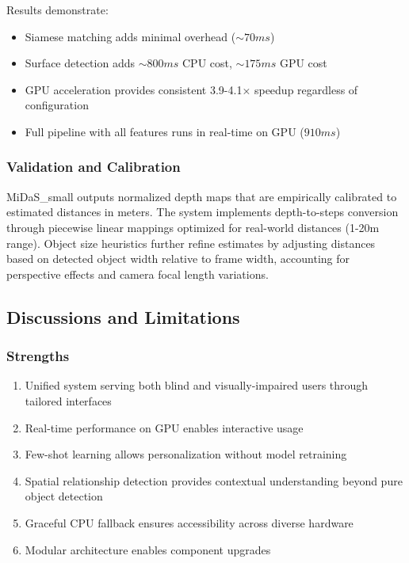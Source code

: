 \documentclass{article}
\begin{document}
Results demonstrate:
\begin{itemize}
    \item Siamese matching adds minimal overhead ($\sim70ms$)
    \item Surface detection adds $\sim800ms$ CPU cost, $\sim175ms$ GPU cost
    \item GPU acceleration provides consistent 3.9-4.1× speedup regardless of configuration
    \item Full pipeline with all features runs in real-time on GPU ($910ms$)
\end{itemize}

\subsubsection{Validation and Calibration}

MiDaS\_small outputs normalized depth maps that are empirically calibrated to estimated distances in meters. The system implements depth-to-steps conversion through piecewise linear mappings optimized for real-world distances (1-20m range). Object size heuristics further refine estimates by adjusting distances based on detected object width relative to frame width, accounting for perspective effects and camera focal length variations.

\subsection{Discussions and Limitations}

\subsubsection{Strengths}

\begin{enumerate}
    \item Unified system serving both blind and visually-impaired users through tailored interfaces
    \item Real-time performance on GPU enables interactive usage
    \item Few-shot learning allows personalization without model retraining
    \item Spatial relationship detection provides contextual understanding beyond pure object detection
    \item Graceful CPU fallback ensures accessibility across diverse hardware
    \item Modular architecture enables component upgrades
\end{enumerate}
\end{document}
